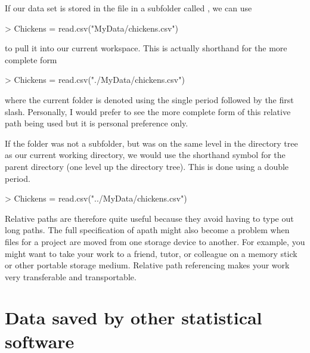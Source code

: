 If our data set is stored in the file  in a  subfolder called , we can use  

\begin{Schunk}
\begin{Sinput}
> Chickens = read.csv("MyData/chickens.csv") 
\end{Sinput}
\end{Schunk}

to pull it into our current workspace. This is actually shorthand for the more complete form 

\begin{Schunk}
\begin{Sinput}
> Chickens = read.csv("./MyData/chickens.csv") 
\end{Sinput}
\end{Schunk}

where the current folder is denoted using the single period followed by the first slash. Personally, I would prefer to see the more complete form of this relative path being used but it is personal preference only. 
 
If the  folder was not a subfolder, but was on the same level in the directory tree as our current working directory, we would use the shorthand symbol for the parent directory (one level up the directory tree). This is done using  a double period. 

\begin{Schunk}
\begin{Sinput}
> Chickens = read.csv("../MyData/chickens.csv") 
\end{Sinput}
\end{Schunk}

 
Relative paths are therefore quite useful because they avoid having to type out long paths. The full specification of apath might also become a problem when files for a project are moved from one storage device to another. For example, you might want to take your work to a friend, tutor, or colleague on a  memory stick or other portable storage medium. Relative path referencing makes your work very transferable and transportable. 
 
 
 
 
 
 
\section{Data saved by other statistical software} 
 
